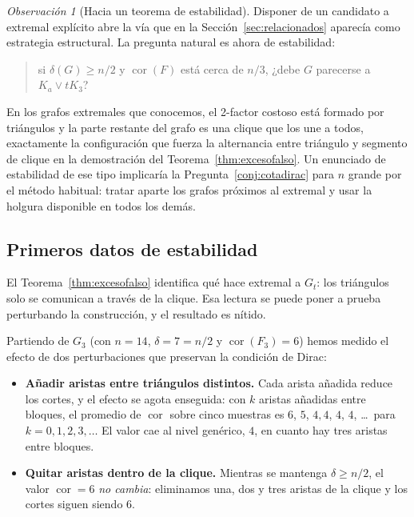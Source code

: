 \documentclass[11pt,a4paper]{article}
\theoremstyle{definition}
\theoremstyle{remark}
\newtheorem{observacion}[teorema]{Observación}
\begin{document}
\begin{observacion}[Hacia un teorema de estabilidad]\label{obs:estabilidad}
Disponer de un candidato a extremal explícito abre la vía que en la Sección~\ref{sec:relacionados} aparecía como estrategia estructural. La pregunta natural es ahora de estabilidad:
\begin{quote}
si $\delta(G)\ge n/2$ y $\operatorname{cor}(F)$ está cerca de $n/3$, ¿debe $G$ parecerse a $K_a\vee tK_3$?
\end{quote}
En los grafos extremales que conocemos, el 2-factor costoso está formado por triángulos y la parte restante del grafo es una clique que los une a todos, exactamente la configuración que fuerza la alternancia entre triángulo y segmento de clique en la demostración del Teorema~\ref{thm:excesofalso}. Un enunciado de estabilidad de ese tipo implicaría la Pregunta~\ref{conj:cotadirac} para $n$ grande por el método habitual: tratar aparte los grafos próximos al extremal y usar la holgura disponible en todos los demás.
\end{observacion}



\subsection{Primeros datos de estabilidad}\label{sub:estabilidaddatos}

El Teorema~\ref{thm:excesofalso} identifica qué hace extremal a $G_t$: los triángulos solo se comunican a través de la clique. Esa lectura se puede poner a prueba perturbando la construcción, y el resultado es nítido.

Partiendo de $G_3$ (con $n=14$, $\delta=7=n/2$ y $\operatorname{cor}(F_3)=6$) hemos medido el efecto de dos perturbaciones que preservan la condición de Dirac:

\begin{itemize}
\item \textbf{Añadir aristas entre triángulos distintos.} Cada arista añadida reduce los cortes, y el efecto se agota enseguida: con $k$ aristas añadidas entre bloques, el promedio de $\operatorname{cor}$ sobre cinco muestras es $6$, $5$, $4{,}4$, $4$, $4$, \dots\ para $k=0,1,2,3,\dots$ El valor cae al nivel genérico, $4$, en cuanto hay tres aristas entre bloques.
\item \textbf{Quitar aristas dentro de la clique.} Mientras se mantenga $\delta\ge n/2$, el valor $\operatorname{cor}=6$ \emph{no cambia}: eliminamos una, dos y tres aristas de la clique y los cortes siguen siendo $6$.
\end{itemize}
\end{document}
